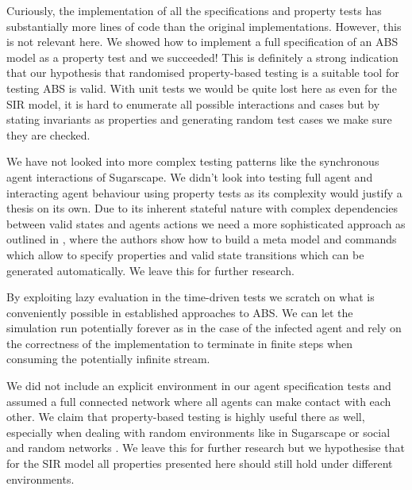 
Curiously, the implementation of all the specifications and property tests has substantially more lines of code than the original implementations. However, this is not relevant here. We showed how to implement a full specification of an ABS model as a property test and we succeeded! This is definitely a strong indication that our hypothesis that randomised property-based testing is a suitable tool for testing ABS is valid. With unit tests we would be quite lost here as even for the SIR model, it is hard to enumerate all possible interactions and cases but by stating invariants as properties and generating random test cases we make sure they are checked.

We have not looked into more complex testing patterns like the synchronous agent interactions of Sugarscape. We didn't look into testing full agent and interacting agent behaviour using property tests as its complexity would justify a thesis on its own. Due to its inherent stateful nature with complex dependencies between valid states and agents actions we need a more sophisticated approach as outlined in \cite{de_vries_-depth_2019}, where the authors show how to build a meta model and commands which allow to specify properties and valid state transitions which can be generated automatically. We leave this for further research.

By exploiting lazy evaluation in the time-driven tests we scratch on what is conveniently possible in established approaches to ABS. We can let the simulation run potentially forever as in the case of the infected agent and rely on the correctness of the implementation to terminate in finite steps when consuming the potentially infinite stream.

We did not include an explicit environment in our agent specification tests and assumed a full connected network where all agents can make contact with each other. We claim that property-based testing is highly useful there as well, especially when dealing with random environments like in Sugarscape or social and random networks \cite{easley_networks_2010,jackson_social_2008}. We leave this for further research but we hypothesise that for the SIR model all properties presented here should still hold under different environments.

